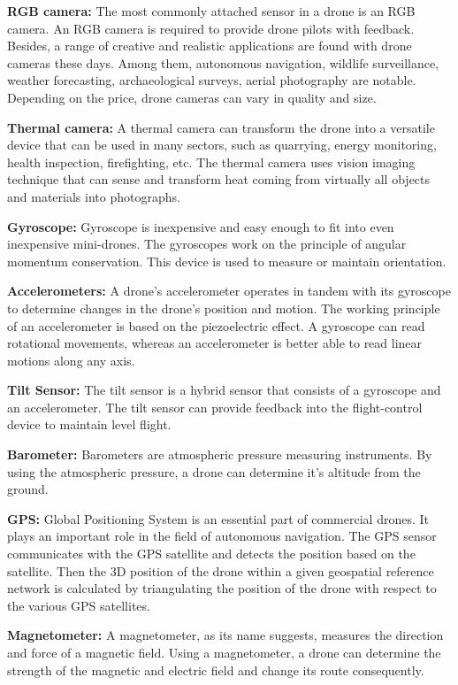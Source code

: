 \textbf{RGB camera:} 
The most commonly attached sensor in a drone is an RGB camera. An RGB camera is required to provide drone pilots with feedback. Besides, a range of creative and realistic applications are found with drone cameras these days. Among them, autonomous navigation, wildlife surveillance, weather forecasting, archaeological surveys, aerial photography are notable. Depending on the price, drone cameras can vary in quality and size.

\textbf{Thermal camera:}
A thermal camera can transform the drone into a versatile device that can be used in many sectors, such as quarrying, energy monitoring, health inspection, firefighting, etc. The thermal camera uses vision imaging technique that can sense and transform heat coming from virtually all objects and materials into photographs. 

\textbf{Gyroscope:}
Gyroscope is inexpensive and easy enough to fit into even inexpensive mini-drones. The gyroscopes work on the principle of angular momentum conservation. This device is used to measure or maintain orientation.

\textbf{Accelerometers:}
A drone's accelerometer operates in tandem with its gyroscope to determine changes in the drone's position and motion. The working principle of an accelerometer is based on the piezoelectric effect. A gyroscope can read rotational movements, whereas an accelerometer is better able to read linear motions along any axis. 

\textbf{Tilt Sensor:}
The tilt sensor is a hybrid sensor that consists of a gyroscope and an accelerometer. The tilt sensor can provide feedback into the flight-control device to maintain level flight.

\textbf{Barometer:}
Barometers are atmospheric pressure measuring instruments. By using the atmospheric pressure, a drone can determine it's altitude from the ground. 

\textbf{GPS:}
Global Positioning System is an essential part of commercial drones. It plays an important role in the field of autonomous navigation. The GPS sensor communicates with the GPS satellite and detects the position based on the satellite. Then the 3D position of the drone within a given geospatial reference network is calculated by triangulating the position of the drone with respect to the various GPS satellites.

\textbf{Magnetometer:}
A magnetometer, as its name suggests, measures the direction and force of a magnetic field. Using a magnetometer, a drone can determine the strength of the magnetic and electric field and change its route consequently.

